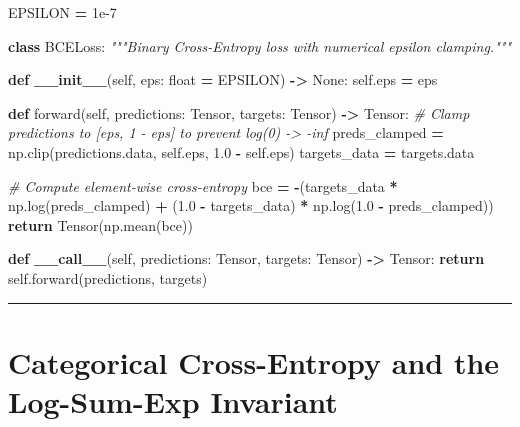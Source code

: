 \documentclass[
  letterpaper,
]{scrbook}
\newenvironment{Shaded}{\begin{snugshade}}{\end{snugshade}}
\newcommand{\BuiltInTok}[1]{#1}
\newcommand{\CommentTok}[1]{\textcolor[rgb]{0.56,0.35,0.01}{\textit{#1}}}
\newcommand{\ControlFlowTok}[1]{\textcolor[rgb]{0.13,0.29,0.53}{\textbf{#1}}}
\newcommand{\FloatTok}[1]{\textcolor[rgb]{0.00,0.00,0.81}{#1}}
\newcommand{\FunctionTok}[1]{\textcolor[rgb]{0.13,0.29,0.53}{\textbf{#1}}}
\newcommand{\KeywordTok}[1]{\textcolor[rgb]{0.13,0.29,0.53}{\textbf{#1}}}
\newcommand{\NormalTok}[1]{#1}
\newcommand{\OperatorTok}[1]{\textcolor[rgb]{0.81,0.36,0.00}{\textbf{#1}}}
\newcommand{\VariableTok}[1]{\textcolor[rgb]{0.00,0.00,0.00}{#1}}
\begin{document}
\begin{Shaded}
\begin{Highlighting}[]
\NormalTok{EPSILON }\OperatorTok{=} \FloatTok{1e{-}7}

\KeywordTok{class}\NormalTok{ BCELoss:}
    \CommentTok{"""Binary Cross{-}Entropy loss with numerical epsilon clamping."""}

    \KeywordTok{def} \FunctionTok{\_\_init\_\_}\NormalTok{(}\VariableTok{self}\NormalTok{, eps: }\BuiltInTok{float} \OperatorTok{=}\NormalTok{ EPSILON) }\OperatorTok{{-}\textgreater{}} \VariableTok{None}\NormalTok{:}
        \VariableTok{self}\NormalTok{.eps }\OperatorTok{=}\NormalTok{ eps}

    \KeywordTok{def}\NormalTok{ forward(}\VariableTok{self}\NormalTok{, predictions: Tensor, targets: Tensor) }\OperatorTok{{-}\textgreater{}}\NormalTok{ Tensor:}
        \CommentTok{\# Clamp predictions to [eps, 1 {-} eps] to prevent log(0) {-}\textgreater{} {-}inf}
\NormalTok{        preds\_clamped }\OperatorTok{=}\NormalTok{ np.clip(predictions.data, }\VariableTok{self}\NormalTok{.eps, }\FloatTok{1.0} \OperatorTok{{-}} \VariableTok{self}\NormalTok{.eps)}
\NormalTok{        targets\_data }\OperatorTok{=}\NormalTok{ targets.data}

        \CommentTok{\# Compute element{-}wise cross{-}entropy}
\NormalTok{        bce }\OperatorTok{=} \OperatorTok{{-}}\NormalTok{(targets\_data }\OperatorTok{*}\NormalTok{ np.log(preds\_clamped) }\OperatorTok{+}\NormalTok{ (}\FloatTok{1.0} \OperatorTok{{-}}\NormalTok{ targets\_data) }\OperatorTok{*}\NormalTok{ np.log(}\FloatTok{1.0} \OperatorTok{{-}}\NormalTok{ preds\_clamped))}
        \ControlFlowTok{return}\NormalTok{ Tensor(np.mean(bce))}

    \KeywordTok{def} \FunctionTok{\_\_call\_\_}\NormalTok{(}\VariableTok{self}\NormalTok{, predictions: Tensor, targets: Tensor) }\OperatorTok{{-}\textgreater{}}\NormalTok{ Tensor:}
        \ControlFlowTok{return} \VariableTok{self}\NormalTok{.forward(predictions, targets)}
\end{Highlighting}
\end{Shaded}

\begin{center}\rule{0.5\linewidth}{0.5pt}\end{center}

\section{Categorical Cross-Entropy and the Log-Sum-Exp
Invariant}\label{categorical-cross-entropy-and-the-log-sum-exp-invariant}
\end{document}
